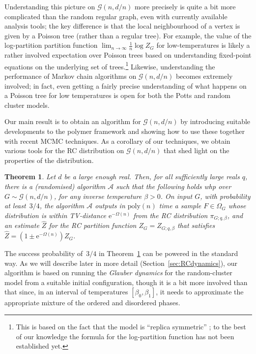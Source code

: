 \documentclass[11pt]{article}
\theoremstyle{plain}
\newtheorem{theorem}{Theorem}
\newcommand{\G}{\mathcal{G}}
\newcommand{\emm}{\mathrm{e}}
\newcommand{\1}{\mathbb{1}}
\begin{document}
Understanding this picture on $\G(n,d/n)$ more precisely is quite a bit more complicated than the random regular graph, even with currently available analysis tools; the key difference is that the local neighbourhood of a vertex is given by a Poisson tree (rather than a regular tree). For example,  the value of the log-partition partition function $\lim_{n\rightarrow \infty}\frac{1}{n}\log Z_G$ for low-temperatures is likely a rather involved expectation over Poisson trees based on understanding fixed-point equations on the underlying set of trees.\footnote{This is based on the fact that the model is ``replica symmetric'' \cite{replica}; to the best of our knowledge the formula for the log-partition function has not been established yet.} Likewise, understanding the performance of Markov chain algorithms on $\G(n,d/n)$ becomes extremely involved; in fact, even getting a fairly precise understanding of what happens  on a Poisson tree for low temperatures is open for both the Potts and random cluster models.


Our main result is to obtain an algorithm for $\G(n,d/n)$ by 
introducing suitable developments to  the polymer framework and showing how to use these together with recent MCMC techniques. As a corollary of our techniques, we obtain various tools for the RC distribution on $\G(n,d/n)$ that shed light on the properties of the distribution.
\begin{theorem}\label{thm:mainthm}
    Let \(d\) be a large enough real. Then, for all sufficiently large reals \(q\), there is a (randomised) algorithm $\mathcal{A}$ such that the following holds whp over \(G\sim\G(n,d/n)\), for any inverse temperature $\beta>0$.
    On input $G$, with probability at least~$3/4$, the algorithm $\mathcal{A}$ outputs in $\mathrm{poly}(n)$ time a sample $F\in \Omega_G$ whose distribution is within TV-distance $\emm^{-\Omega(n)}$ from the RC distribution $\pi_{G;q,\beta}$, and an estimate $\hat Z$ for the RC partition function $Z_G=Z_{G;q,\beta}$ that satisfies $\hat Z=(1\pm \emm^{-\Omega(n)})Z_G$. 
\end{theorem}
The success probability of~$3/4$ in Theorem~\ref{thm:mainthm} can be powered in the standard way.
As we will describe later in more detail (Section~\ref{sec:RCdynamics}), our algorithm is based on running the \textit{Glauber dynamics} for the random-cluster model from a suitable initial configuration, though it is a bit more involved than that since, in an interval of temperatures $[\beta_0,\beta_1]$, it needs to approximate the appropriate mixture of the ordered and disordered phases. 
\end{document}
